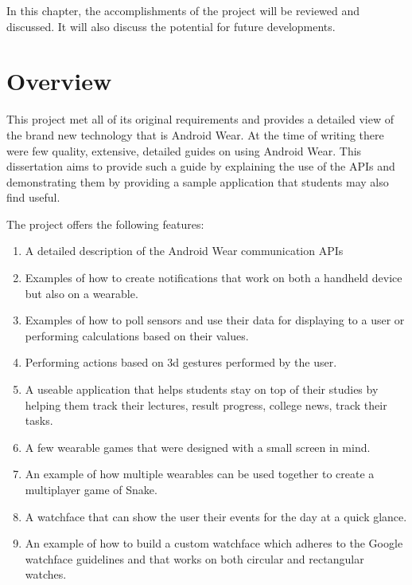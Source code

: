 In this chapter, the accomplishments of the project will be reviewed and
discussed. It will also discuss the potential for future developments.

\section{Overview}

This project met all of its original requirements and provides a detailed view
of the brand new technology that is Android Wear. At the time of writing there
were few quality, extensive, detailed guides on using Android Wear. This
dissertation aims to provide such a guide by explaining the use of the APIs and
demonstrating them by providing a sample application that students may also find
useful.

The project offers the following features:
\begin{enumerate}
\item A detailed description of the Android Wear communication APIs
\item Examples of how to create notifications that work on both a handheld
    device but also on a wearable.
\item Examples of how to poll sensors and use their data for displaying to 
    a user or performing calculations based on their values.
\item Performing actions based on 3d gestures performed by the user.
\item A useable application that helps students stay on top of their studies
    by helping them track their lectures, result progress, college news,
    track their tasks.
\item A few wearable games that were designed with a small screen in mind.
\item An example of how multiple wearables can be used together to create a 
    multiplayer game of Snake.
\item A watchface that can show the user their events for the day at a quick
    glance.
\item An example of how to build a custom watchface which adheres to the Google
    watchface guidelines and that works on both circular and rectangular
    watches.
\end{enumerate}

